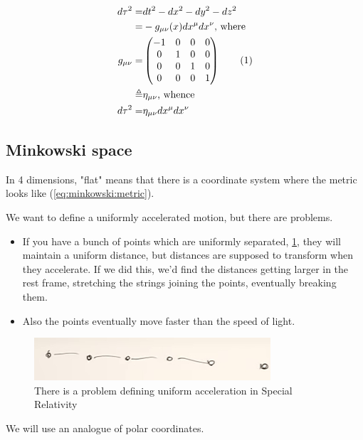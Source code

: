 \documentclass[]{article}
\newcommand\numberthis{\addtocounter{equation}{1}\tag{\theequation}}
\begin{document}
{\begin{align*}
	d \tau^2 =& dt^2 -dx^2 -dy^2 -dz^2\\
	=& - g_{\mu\nu}(x) dx^\mu dx^\nu \text{, where }\\
	g_{\mu\nu} =& \begin{pmatrix}
		-1 &0&0&0\\
		0&1&0&0\\
		0&0&1&0\\
		0&0&0&1
	\end{pmatrix} \numberthis \label{eq:minkowski:metric}\\
	\triangleq& \eta_{\mu\nu} \text{, whence} \\
	d \tau^2=& \eta_{\mu\nu} dx^\mu dx^\nu
\end{align*}

\subsection{Minkowski space}

In 4 dimensions, "flat" means that there is a coordinate system where the metric looks like (\ref{eq:minkowski:metric}).

We want to define a uniformly accelerated motion, but there are problems. \begin{itemize}
	\item If you have a bunch of points which are uniformly separated, \ref{fig:gr-4-uniform-acceleration}, they will maintain a uniform distance, but distances are supposed to transform when they accelerate. If we did this, we'd find the distances getting larger in the rest frame, stretching the strings joining the points, eventually breaking them.
	\item Also the points eventually move faster than the speed of light.
\end{itemize}

\begin{figure}[H]
	\caption[Defining uniform acceleration in Special Relativity]{There is a problem defining uniform acceleration in Special Relativity }\label{fig:gr-4-uniform-acceleration}
	\includegraphics{gr-4-uniform-acceleration}
\end{figure}

We will use an analogue of polar coordinates.

}
\end{document}
